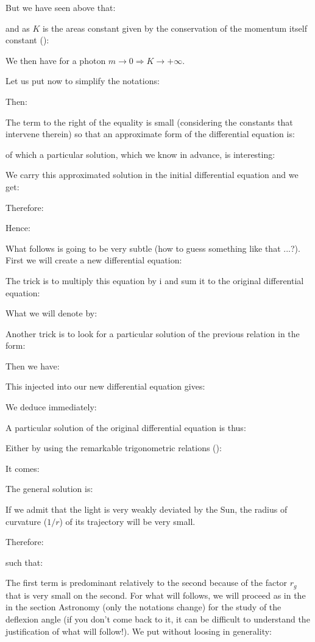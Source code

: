 	But we have seen above that:
	
	and as $K$ is the areas constant given by the conservation of the momentum itself constant ():
	
	We then have for a photon $m\rightarrow 0\Rightarrow K\rightarrow +\infty$.
	
	Let us put now to simplify the notations:
	
	Then:
	
	The term to the right of the equality is small (considering the constants that intervene therein) so that an approximate form of the differential equation is:
	
	of which a particular solution, which we know in advance, is interesting:
	
	We carry this approximated solution in the initial differential equation and we get:
	
	Therefore:
	
	Hence:
	
	What follows is going to be very subtle (how to guess something like that ...?). First we will create a new differential equation:
	
	The trick is to multiply this equation by $\mathrm{i}$ and sum it to the original differential equation:
	
	What we will denote by:
	
	Another trick is to look for a particular solution of the previous relation in the form:
	
	Then we have:
	
	This injected into our new differential equation gives:
	
	We deduce immediately:
	
	A particular solution of the original differential equation is thus:
	
	Either by using the remarkable trigonometric relations ():
	
	It comes:
	
	The general solution is:
	
	If we admit that the light is very weakly deviated by the Sun, the radius of curvature ($1/r$) of its trajectory will be very small.

	Therefore:
	
	such that:
	
	The first term is predominant relatively to the second because of the factor $r_g$ that is very small on the second. For what will follows, we will proceed as in the in the section Astronomy (only the notations change) for the study of the deflexion angle (if you don't come back to it, it can be difficult to understand the justification of what will follow!). We put without loosing in generality:
	
